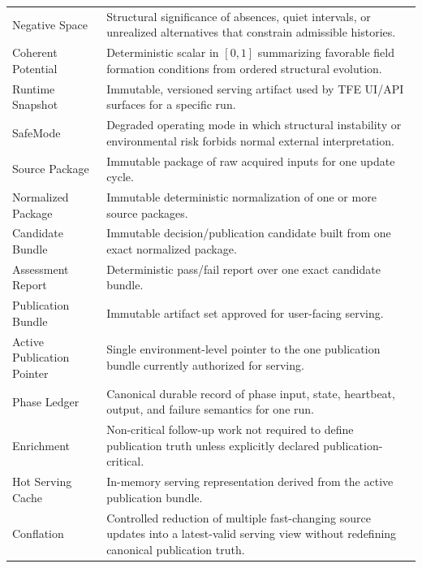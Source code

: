 \begin{longtable}{p{}p{}}
Negative Space & Structural significance of absences, quiet intervals, or unrealized alternatives that constrain admissible histories. \\
Coherent Potential & Deterministic scalar in $[0,1]$ summarizing favorable field formation conditions from ordered structural evolution. \\
Runtime Snapshot & Immutable, versioned serving artifact used by TFE UI/API surfaces for a specific run. \\
SafeMode & Degraded operating mode in which structural instability or environmental risk forbids normal external interpretation. \\
Source Package & Immutable package of raw acquired inputs for one update cycle. \\
Normalized Package & Immutable deterministic normalization of one or more source packages. \\
Candidate Bundle & Immutable decision/publication candidate built from one exact normalized package. \\
Assessment Report & Deterministic pass/fail report over one exact candidate bundle. \\
Publication Bundle & Immutable artifact set approved for user-facing serving. \\
Active Publication Pointer & Single environment-level pointer to the one publication bundle currently authorized for serving. \\
Phase Ledger & Canonical durable record of phase input, state, heartbeat, output, and failure semantics for one run. \\
Enrichment & Non-critical follow-up work not required to define publication truth unless explicitly declared publication-critical. \\
Hot Serving Cache & In-memory serving representation derived from the active publication bundle. \\
Conflation & Controlled reduction of multiple fast-changing source updates into a latest-valid serving view without redefining canonical publication truth. \\
\bottomrule
\end{longtable}

